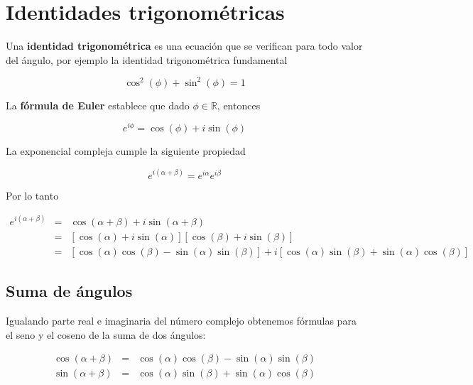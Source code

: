 \section{Identidades trigonométricas}

\begin{definition} 
Una \textbf{identidad trigonométrica} es una ecuación que se verifican para todo valor del ángulo, por ejemplo la identidad trigonométrica fundamental 

$$ \cos^2(\phi) + \sin^2(\phi) = 1 $$
\end{definition}

\begin{definition}
La \textbf{fórmula de Euler} establece que dado $\phi \in \mathbb{R}$, entonces

$$ e^{i \phi} = \cos(\phi) + i \sin(\phi) $$
\end{definition}

\begin{observation}
La exponencial compleja cumple la siguiente propiedad 

$$ e^{i (\alpha + \beta)} = e^{i \alpha} e^{i \beta} $$

Por lo tanto

\begin{eqnarray*} 
	e^{i (\alpha + \beta)} &=& \cos(\alpha + \beta) + i \sin(\alpha + \beta) \\
	&=& [\cos(\alpha) + i \sin(\alpha) ] [\cos(\beta) + i \sin(\beta)] \\
	&=& [\cos(\alpha)\cos(\beta) - \sin(\alpha)\sin(\beta)] + i [\cos(\alpha)\sin(\beta) + \sin(\alpha)\cos(\beta)]
\end{eqnarray*}
	
\end{observation}

\subsection{Suma de ángulos} 

Igualando parte real e imaginaria del número complejo obtenemos fórmulas para el seno y el coseno de la suma de dos ángulos:

 

\begin{eqnarray*}
\cos(\alpha + \beta) &=& \cos(\alpha)\cos(\beta) - \sin(\alpha)\sin(\beta) \\
\sin(\alpha + \beta) &=& \cos(\alpha)\sin(\beta) + \sin(\alpha)\cos(\beta)
\end{eqnarray*}

